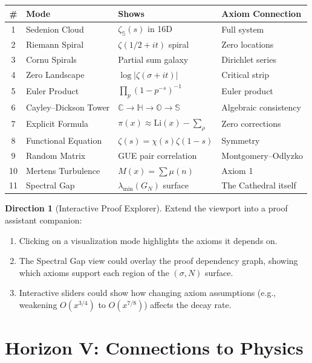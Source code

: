 \documentclass[11pt,a4paper]{article}
\theoremstyle{definition}
\newtheorem{direction}[definition]{Direction}
\newcommand{\CC}{\mathbb{C}}
\newcommand{\HH}{\mathbb{H}}
\newcommand{\OO}{\mathbb{O}}
\newcommand{\SSS}{\mathbb{S}}
\begin{document}
\begin{center}
\small
\begin{tabular}{@{}clll@{}}
\toprule
\textbf{\#} & \textbf{Mode} & \textbf{Shows} & \textbf{Axiom Connection} \\
\midrule
1 & Sedenion Cloud & $\zeta_{\SSS}(s)$ in 16D & Full system \\
2 & Riemann Spiral & $\zeta(1/2+it)$ spiral & Zero locations \\
3 & Cornu Spirals & Partial sum galaxy & Dirichlet series \\
4 & Zero Landscape & $\log|\zeta(\sigma+it)|$ & Critical strip \\
5 & Euler Product & $\prod_p (1-p^{-s})^{-1}$ & Euler product \\
6 & Cayley--Dickson Tower & $\CC \to \HH \to \OO \to \SSS$ & Algebraic consistency \\
7 & Explicit Formula & $\pi(x) \approx \mathrm{Li}(x) - \sum_\rho$ & Zero corrections \\
8 & Functional Equation & $\zeta(s) = \chi(s)\zeta(1-s)$ & Symmetry \\
9 & Random Matrix & GUE pair correlation & Montgomery--Odlyzko \\
10 & Mertens Turbulence & $M(x) = \sum \mu(n)$ & Axiom 1 \\
11 & Spectral Gap & $\lambda_{\min}(G_N)$ surface & The Cathedral itself \\
\bottomrule
\end{tabular}
\end{center}

\begin{direction}[Interactive Proof Explorer]
Extend the viewport into a proof assistant companion:
\begin{enumerate}
  \item Clicking on a visualization mode highlights the axioms it depends on.
  \item The Spectral Gap view could overlay the proof dependency graph,
    showing which axioms support each region of the $(\sigma, N)$ surface.
  \item Interactive sliders could show how changing axiom assumptions
    (e.g., weakening $O(x^{3/4})$ to $O(x^{7/8})$) affects the decay
    rate.
\end{enumerate}
\end{direction}

\section{Horizon V: Connections to Physics}
\label{sec:physics}
\end{document}
